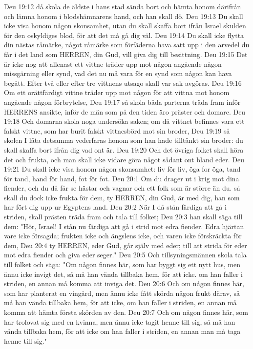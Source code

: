 Deu 19:12  då skola de äldste i hans stad sända bort och hämta honom därifrån och lämna honom i blodshämnarens hand, och han skall dö.
Deu 19:13  Du skall icke visa honom någon skonsamhet, utan du skall skaffa bort ifrån Israel skulden för den oskyldiges blod, för att det må gå dig väl.
Deu 19:14  Du skall icke flytta din nästas råmärke, något råmärke som förfäderna hava satt upp i den arvedel du får i det land som HERREN, din Gud, vill giva dig till besittning.
Deu 19:15  Det är icke nog att allenast ett vittne träder upp mot någon angående någon missgärning eller synd, vad det nu må vara för en synd som någon kan hava begått. Efter två eller efter tre vittnens utsago skall var sak avgöras.
Deu 19:16  Om ett orättfärdigt vittne träder upp mot någon för att vittna mot honom angående någon förbrytelse,
Deu 19:17  så skola båda parterna träda fram inför HERRENS ansikte, inför de män som på den tiden äro präster och domare.
Deu 19:18  Och domarna skola noga undersöka saken; om då vittnet befinnes vara ett falskt vittne, som har burit falskt vittnesbörd mot sin broder,
Deu 19:19  så skolen I låta detsamma vederfaras honom som han hade tilltänkt sin broder: du skall skaffa bort ifrån dig vad ont är.
Deu 19:20  Och det övriga folket skall höra det och frukta, och man skall icke vidare göra något sådant ont bland eder.
Deu 19:21  Du skall icke visa honom någon skonsamhet: liv för liv, öga for öga, tand för tand, hand för hand, fot för fot.
Deu 20:1  Om du drager ut i krig mot dina fiender, och du då får se hästar och vagnar och ett folk som är större än du. så skall du dock icke frukta för dem, ty HERREN, din Gud, är med dig, han som har fört dig upp ur Egyptens land.
Deu 20:2  När I då stån färdiga att gå i striden, skall prästen träda fram och tala till folket;
Deu 20:3  han skall säga till dem: "Hör, Israel! I stån nu färdiga att gå i strid mot edra fiender. Edra hjärtan vare icke försagda; frukten icke och ängslens icke, och varen icke förskräckta för dem,
Deu 20:4  ty HERREN, eder Gud, går själv med eder; till att strida för eder mot edra fiender och giva eder seger."
Deu 20:5  Och tillsyningsmännen skola tala till folket och säga: "Om någon finnes här, som har byggt sig ett nytt hus, men ännu icke invigt det, så må han vända tillbaka hem, för att icke. om han faller i striden, en annan må komma att inviga det.
Deu 20:6  Och om någon finnes här, som har planterat en vingård, men ännu icke fått skörda någon frukt därav, så må han vända tillbaka hem, för att icke, om han faller i striden, en annan må komma att hämta första skörden av den.
Deu 20:7  Och om någon finnes här, som har trolovat sig med en kvinna, men ännu icke tagit henne till sig, så må han vända tillbaka hem, för att icke om han faller i striden, en annan man må taga henne till sig."
